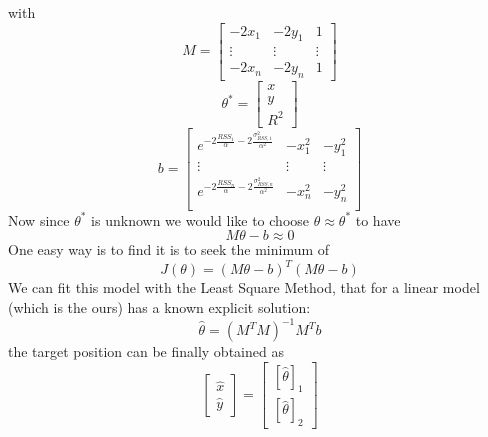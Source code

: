 \documentclass[12pt]{report}
\begin{document}
with $$M=\begin{bmatrix}
        -2x_1 & -2y_1 & 1\\
        \vdots&\vdots&\vdots\\
        -2x_n & -2y_n & 1
    \end{bmatrix}$$
$$\theta^* =     \begin{bmatrix}
        x\\
        y\\
        R^2
    \end{bmatrix}$$
$$b=    \begin{bmatrix}
        e^{-2\frac{RSS_1}{\alpha}-2\frac{\sigma^2_{RSS,1}}{\alpha^2}} & -x_1^2 & -y_1^2\\
        \vdots&\vdots&\vdots\\
        e^{-2\frac{RSS_n}{\alpha}-2\frac{\sigma^2_{RSS,n}}{\alpha^2}} & -x_n^2 & -y_n^2\\
    \end{bmatrix}$$
Now since $\theta^*$ is unknown we would like to choose $\theta\approx\theta^*$ to have 
\begin{equation}
    M\theta-b\approx0
\end{equation}
One easy way is to find it is to seek the minimum of 
\begin{equation}
    J(\theta)=(M\theta - b)^T(M\theta - b)
\end{equation}
We can fit this model with the Least Square Method, that for a linear model (which is the ours) has a known explicit solution:
\begin{equation}
    \hat{\theta}=(M^TM)^{-1}M^Tb
\end{equation}
the target position can be finally obtained as 
\begin{equation}
\begin{bmatrix}
    \hat{x}\\
    \hat{y}
\end{bmatrix}=
\begin{bmatrix}
    [\hat{\theta}]_1\\
    [\hat{\theta}]_2
\end{bmatrix}
\end{equation}

\clearpage
\end{document}
